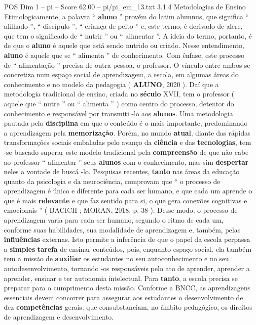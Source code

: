 \begin{textsample}{POS Dim 1 – pi – Score 62.00 – pi/pi\_em\_13.txt}  \label{ex:f1_pos_053}
3.1.4 Metodologias de Ensino Etimologicamente, a palavra “ \textbf{aluno} ” provém do latim alumnus, que significa “ afilhado ”, “ discípulo ”, “ criança de peito ” e, este termo, é derivado de alere, que tem o significado de “ nutrir ” ou “ alimentar ”.
A ideia do termo, portanto, é de que o \textbf{aluno} é aquele que está sendo nutrido ou criado.
Nesse entendimento, \textbf{aluno} é aquele que se “ alimenta ” de conhecimento.
Com ênfase, este processo de “ alimentação ” precisa de outra pessoa, o professor.
O vínculo entre ambos se concretiza num espaço social de aprendizagem, a escola, em algumas áreas do conhecimento e no modelo da pedagogia ( \textbf{ALUNO}, 2020 ).
Daí que a metodologia tradicional de ensino, criada no \textbf{século} XVII, tem o professor ( aquele que “ nutre ” ou “ alimenta ” ) como centro do processo, detentor do conhecimento e responsável por transmiti -lo aos \textbf{alunos}.
Uma metodologia pautada pela \textbf{disciplina} em que o conteúdo é o mais importante, predominando a aprendizagem pela \textbf{memorização}.
Porém, no mundo \textbf{atual}, diante das rápidas transformações sociais embaladas pelo avanço da \textbf{ciência} e das \textbf{tecnologias}, tem -se buscado superar este modelo tradicional pela \textbf{compreensão} de que não cabe ao professor “ alimentar ” seus \textbf{alunos} com o conhecimento, mas sim \textbf{despertar} neles a vontade de buscá -lo.
Pesquisas recentes, \textbf{tanto} nas áreas da educação quanto da psicologia e da neurociência, comprovam que “ o processo de aprendizagem é único e diferente para cada ser humano, e que cada um aprende o que é mais \textbf{relevante} e que faz sentido para si, o que gera conexões cognitivas e emocionais ” ( BACICH ; MORAN, 2018, p. 38 ).
Desse modo, o processo de aprendizagem varia para cada ser humano, segundo o ritmo de cada um, conforme suas habilidades, sua modalidade de aprendizagem e, também, pelas \textbf{influências} externas.
Isto permite a inferência de que o papel da escola perpassa a \textbf{simples} \textbf{tarefa} de ensinar conteúdos, pois, enquanto espaço social, ela também tem a missão de \textbf{auxiliar} os estudantes no seu autoconhecimento e no seu autodesenvolvimento, tornando -os responsáveis pelo ato de aprender, aprender a aprender, ensinar e ter autonomia intelectual.
Para \textbf{tanto}, a escola precisa se preparar para o cumprimento desta missão.
Conforme a BNCC, as aprendizagens essenciais devem concorrer para assegurar aos estudantes o desenvolvimento de dez \textbf{competências} gerais, que consubstanciam, no âmbito pedagógico, os direitos de aprendizagem e desenvolvimento.

\end{textsample}
